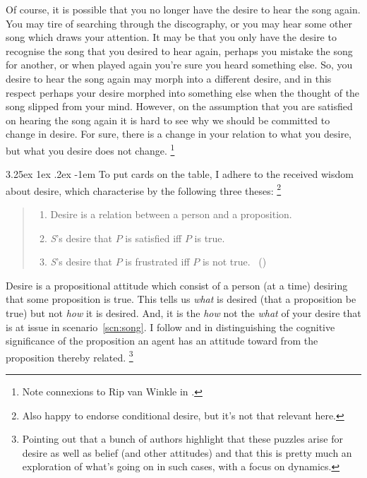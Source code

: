 \documentclass[10pt]{article}
\makeatletter
\renewcommand\paragraph{\@startsection{paragraph}{5}{\z@}%
  {3.25ex \@plus1ex \@minus.2ex}%
  {-1em}%
  {\normalfont\normalsize\bfseries}}
\makeatother
\begin{document}
Of course, it is possible that you no longer have the desire to hear the song again.
You may tire of searching through the discography, or you may hear some other song which draws your attention.
It may be that you only have the desire to recognise the song that you desired to hear again, perhaps you mistake the song for another, or when played again you're sure you heard something else.
So, you desire to hear the song again may morph into a different desire, and in this respect perhaps your desire morphed into something else when the thought of the song slipped from your mind.
However, on the assumption that you are satisfied on hearing the song again it is hard to see why we should be committed to change in desire.
For sure, there is a change in your relation to what you desire, but what you desire does not change.\nolinebreak
\footnote{\color{red} Note connexions to Rip van Winkle in \textcite{Perry:1997aa}.}

\paragraph{ }
To put cards on the table, I adhere to the received wisdom about desire, which \citeauthor{McDaniel:2008aa} characterise by the following three theses:\nolinebreak
\footnote{\color{red} Also happy to endorse conditional desire, but it's not that relevant here.}
\begin{quote}
  \begin{enumerate}[label=RW\arabic*., ref=(RW\arabic*)]
  \item Desire is a relation between a person and a proposition.
  \item \emph{S}'s desire that \(P\) is satisfied iff \(P\) is true.
  \item \emph{S}'s desire that \(P\) is frustrated iff \(P\) is not true.\nolinebreak
    \mbox{ }\hfill(\citeyear[269]{McDaniel:2008aa})
  \end{enumerate}
\end{quote}

Desire is a propositional attitude which consist of a person (at a time) desiring that some proposition is true.
This tells us \emph{what} is desired (that a proposition be true) but not \emph{how} it is desired.
And, it is the \emph{how} not the \emph{what} of your desire that is at issue in scenario~\ref{scn:song}.
I follow \citeauthor{Kaplan:1989ab} and \citeauthor{Perry:1993aa} in distinguishing the cognitive significance of the proposition an agent has an attitude toward from the proposition thereby related.\nolinebreak
\footnote{\color{red} Pointing out that a bunch of authors highlight that these puzzles arise for desire as well as belief (and other attitudes) and that this is pretty much an exploration of what's going on in such cases, with a focus on dynamics.}
\end{document}
